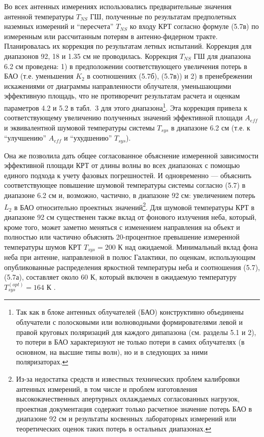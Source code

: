 Во всех антенных измерениях использовались предварительные значения антенной температуры $T_{NS}$
ГШ, полученные по результатам предполетных наземных измерений и ``пересчета'' $T_{NS}$ ко входу КРТ
согласно формуле (5.7в) по измеренным или рассчитанным потерям  \cite{RAUH} в антенно-фидерном
тракте. Планировалась их коррекция по результатам летных испытаний. Коррекция для диапазонов 92, 18
и 1.35 см не проводилась. Коррекция $T_{NS}$ ГШ для диапазона 6.2 см проведена: 1) в предположении
соответствующего увеличения потерь в БАО (т.е. уменьшения $K_2$ в соотношениях (5.7б), (5.7в)) и 2)
в пренебрежении искажениями от диаграммы направленности облучателя, уменьшающими эффективную
площадь, что не противоречит результатам расчета  \cite{} и оценкам параметров 4.2 и 5.2 в табл.~3
для этого диапазона\footnote {Так как в блоке антенных облучателей (БАО) конструктивно объединены
облучатели с полосковыми или волноводными формирователями левой и правой круговых поляризаций для
каждого дипапазона (см. разделы 5.1 и  2), то потери в БАО характеризуют не только потери в самих
облучателях (в основном, на высшие типы волн), но и в следующих за ними поляризаторах. }. Эта
коррекция привела к соответствующему увеличению полученных значений эффективной площади $A_{eff}$ и
эквивалентной шумовой температуры системы $T_{sys}$ в диапазоне 6.2 см (т.е. к ``улучшению''
$A_{eff}$ и ``ухудшению'' $T_{sys}$).

Она же  позволила дать общее согласованное объяснение измеренной зависимости эффективной площади КРТ
от длины волны во всех диапазонах с помощью единого подхода к учету фазовых погрешностей. И
одновременно --- объяснить соответствующее повышение шумовой температуры системы согласно (5.7)  в
диапазоне 6.2 см и, возможно, частично, в диапазоне 92 см: увеличением потерь $L_2$ в БАО
относительно проектных значений\footnote {Из-за недостатка средств  и известных технических проблем
калибровки антенных измерений, в том числе и проблем изготовления высококачественных апертурных
охлаждаемых согласованных нагрузок, проектная документация содержит только расчетное значение потерь
БАО в диапазоне 92 см и результаты косвенных лабораторных измерений  или теоретических оценок таких
потерь в остальных диапазонах.}. Для шумовой температуры КРТ в диапазоне 92 см существенен также
вклад от фонового излучения неба, который, кроме того, может заметно меняться с изменением
направления на объект и полностью или частично объяснять 20-процентное превышение измеренной
температуры шумов КРТ $T_{sys} = 200$ К над ожидаемой. Минимальный вклад фона неба при антенне,
направленной в полюс Галактики, по оценкам, использующим опубликованные распределения яркостной
температуры неба и соотношения (5.7), (5.7а), составляет около 60 К, который включен в ожидаемую
температуру $T_{sys}^{(opt)} = 164 $ К \cite{RAUH}.


